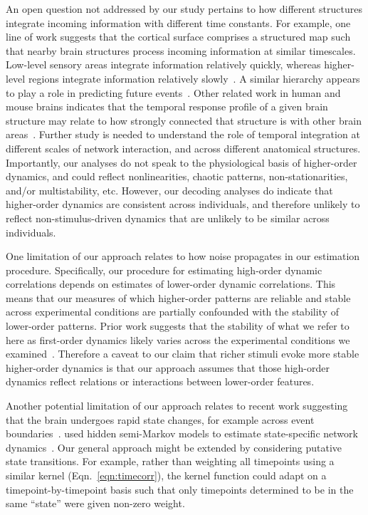 \documentclass[english]{article}
\begin{document}
An open question not addressed by our study pertains to how different
structures integrate incoming information with different time
constants.  For example, one line of work suggests that the cortical
surface comprises a structured map such that nearby brain structures
process incoming information at similar timescales.  Low-level sensory
areas integrate information relatively quickly, whereas higher-level
regions integrate information relatively slowly~\citep{BaldEtal17,
  HassEtal08, HassEtal15, HoneEtal12a, LernEtal11, LernEtal14,
  ChieHone19}.  A similar hierarchy appears to play a role in
predicting future events~\citep{LeeEtal20}.  Other related work in
human and mouse brains indicates that the temporal response profile of
a given brain structure may relate to how strongly connected that
structure is with other brain areas~\citep{FallEtal20}.  Further study
is needed to understand the role of temporal integration at different
scales of network interaction, and across different anatomical
structures. Importantly, our analyses do not speak to the
physiological basis of higher-order dynamics, and could reflect
nonlinearities, chaotic patterns, non-stationarities, and/or
multistability, etc. However, our decoding analyses do indicate that
higher-order dynamics are consistent across individuals, and therefore
unlikely to reflect non-stimulus-driven dynamics that are unlikely to
be similar across individuals.

One limitation of our approach relates to how noise propagates in our
estimation procedure.  Specifically, our procedure for estimating
high-order dynamic correlations depends on estimates of lower-order
dynamic correlations.  This means that our measures of which
higher-order patterns are reliable and stable across experimental
conditions are partially confounded with the stability of lower-order
patterns.  Prior work suggests that the stability of what we refer to
here as first-order dynamics likely varies across the experimental
conditions we examined~\citep{SimoEtal16}.  Therefore a caveat to our
claim that richer stimuli evoke more stable higher-order dynamics is
that our approach assumes that those high-order dynamics reflect
relations or interactions between lower-order features.

Another potential limitation of our approach relates to recent work
suggesting that the brain undergoes rapid state changes, for example
across event boundaries~\citep[e.g.,][]{BaldEtal17}.
\cite{ShapEtal19} used hidden semi-Markov models to estimate
state-specific network dynamics~\citep[also see][]{VidaEtal18}.  Our
general approach might be extended by considering putative state
transitions. For example, rather than weighting all timepoints using a
similar kernel (Eqn.~\ref{eqn:timecorr}), the kernel function could
adapt on a timepoint-by-timepoint basis such that only timepoints
determined to be in the same ``state'' were given non-zero weight.
\end{document}
